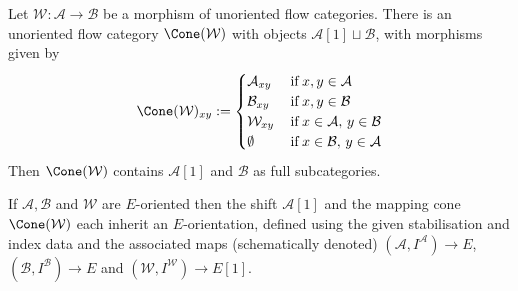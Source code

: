 \documentclass{TPmod}
\newcommand{\cA}{\mathcal{A}}
\newcommand{\cB}{\mathcal{B}}
\newcommand{\cW}{\mathcal{W}}
\numberwithin{equation}{section}
\begin{document}
    \begin{defn}
 Let $\cW: \cA \rightarrow \cB$ be a morphism of unoriented flow categories. There is an unoriented flow category $\Cone(\cW)$ with objects $\cA[1] \sqcup \cB$, with morphisms given by
            $$\Cone(\cW)_{xy} := \begin{cases}
                \cA_{xy} & \,\mathrm{if}\,x,y\in\cA\\
                \cB_{xy} & \,\mathrm{if}\,x,y\in\cB\\
                \cW_{xy} & \,\mathrm{if}\,x\in\cA,\,y\in\cB\\
                \emptyset & \,\mathrm{if}\,x\in\cB,\,y\in\cA
            \end{cases}$$
            Then $\Cone(\cW)$ contains $\cA[1]$ and $\cB$ as full subcategories. 
    \end{defn}
    If $\cA,\cB$ and $\cW$ are $E$-oriented then the shift $\cA[1]$ and the mapping cone $\Cone(\cW)$ each inherit an $E$-orientation, defined using the given stabilisation and index data and the associated maps (schematically denoted) $(\cA,I^\cA) \to E$, $(\cB,I^{\cB}) \to E$ and $(\cW,I^{\cW}) \to E[1]$. 
    
\end{document}

